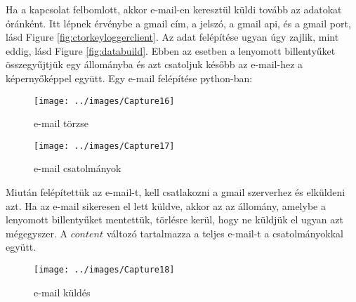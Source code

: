 \documentclass[a4paper, 11pt]{article}
\begin{document}
Ha a kapcsolat felbomlott, akkor e-mail-en keresztül küldi tovább az adatokat óránként. Itt lépnek érvénybe a gmail cím, a jelszó, a gmail api, és a gmail port, lásd Figure \ref{fig:ctorkeyloggerclient}. Az adat felépítése ugyan úgy zajlik, mint eddig, lásd Figure \ref{fig:databuild}. Ebben az esetben a lenyomott billentyűket összegyűjtjük egy állományba és azt csatoljuk később az e-mail-hez a képernyőképpel együtt. Egy e-mail felépítése python-ban:
\begin{figure}[H]
\centering
\texttt{[image: ../images/Capture16]}
\caption{e-mail törzse}
\label{fig:emailbody}
\end{figure}
\begin{figure}[H]
\centering
\texttt{[image: ../images/Capture17]}
\caption{e-mail csatolmányok}
\label{fig:emailattach}
\end{figure}
Miután felépítettük az e-mail-t, kell csatlakozni a gmail szerverhez és elküldeni azt. Ha az e-mail sikeresen el lett küldve, akkor az az állomány, amelybe a lenyomott billentyűket mentettük, törlésre kerül, hogy ne küldjük el ugyan azt mégegyszer. A $content$ változó tartalmazza a teljes e-mail-t a csatolmányokkal együtt.
\begin{figure}[H]
\centering
\texttt{[image: ../images/Capture18]}
\caption{e-mail küldés}
\label{fig:sendemail}
\end{figure}
\end{document}
